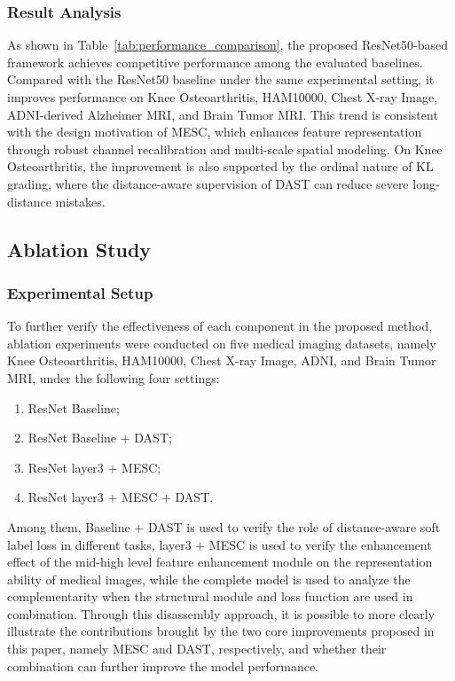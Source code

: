 \documentclass[runningheads]{llncs}
\begin{document}
\subsubsection{Result Analysis}
As shown in Table~\ref{tab:performance_comparison}, the proposed ResNet50-based framework achieves competitive performance among the evaluated baselines. Compared with the ResNet50 baseline under the same experimental setting, it improves performance on Knee Osteoarthritis, HAM10000, Chest X-ray Image, ADNI-derived Alzheimer MRI, and Brain Tumor MRI. This trend is consistent with the design motivation of MESC, which enhances feature representation through robust channel recalibration and multi-scale spatial modeling. On Knee Osteoarthritis, the improvement is also supported by the ordinal nature of KL grading, where the distance-aware supervision of DAST can reduce severe long-distance mistakes.

\subsection{Ablation Study}
\subsubsection{Experimental Setup}

To further verify the effectiveness of each component in the proposed method, ablation experiments were conducted on five medical imaging datasets, namely Knee Osteoarthritis, HAM10000, Chest X-ray Image, ADNI, and Brain Tumor MRI, under the following four settings:
 
 \begin{enumerate}
    \item ResNet Baseline;
    \item ResNet Baseline + DAST;
    \item ResNet layer3 + MESC;
    \item ResNet layer3 + MESC + DAST.
\end{enumerate}
 
 Among them, Baseline + DAST is used to verify the role of distance-aware soft label loss in different tasks, layer3 + MESC is used to verify the enhancement effect of the mid-high level feature enhancement module on the representation ability of medical images, while the complete model is used to analyze the complementarity when the structural module and loss function are used in combination. Through this disassembly approach, it is possible to more clearly illustrate the contributions brought by the two core improvements proposed in this paper, namely MESC and DAST, respectively, and whether their combination can further improve the model performance.
\end{document}
